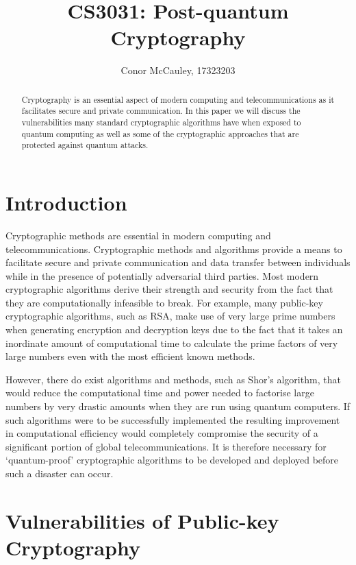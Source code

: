 \documentclass[journal]{IEEEtran}
\begin{document}
\title{CS3031: Post-quantum Cryptography}
\author{Conor McCauley, 17323203}

\maketitle

\begin{abstract}
Cryptography is an essential aspect of modern computing and telecommunications as it facilitates secure and private communication. In this paper we will discuss the vulnerabilities many standard cryptographic algorithms have when exposed to quantum computing as well as some of the cryptographic approaches that are protected against quantum attacks.
\end{abstract}

\section{Introduction}

Cryptographic methods are essential in modern computing and telecommunications. Cryptographic methods and algorithms provide a means to facilitate secure and private communication and data transfer between individuals while in the presence of potentially adversarial third parties. Most modern cryptographic algorithms derive their strength and security from the fact that they are computationally infeasible to break. For example, many public-key cryptographic algorithms, such as RSA, make use of very large prime numbers when generating encryption and decryption keys due to the fact that it takes an inordinate amount of computational time to calculate the prime factors of very large numbers even with the most efficient known methods.

However, there do exist algorithms and methods, such as Shor's algorithm, that would reduce the computational time and power needed to factorise large numbers by very drastic amounts when they are run using quantum computers. If such algorithms were to be successfully implemented the resulting improvement in computational efficiency would completely compromise the security of a significant portion of global telecommunications. It is therefore necessary for `quantum-proof' cryptographic algorithms to be developed and deployed before such a disaster can occur.

\section{Vulnerabilities of Public-key Cryptography}
\end{document}
